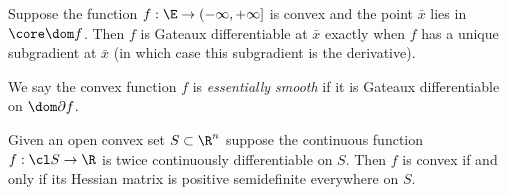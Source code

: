 \documentclass[../borwein-lewis_notes.tex]{subfiles}
\begin{document}
\begin{corollary}
\label{3.1.10} Suppose the function $f:\E\to(-\infty,+\infty]$ is convex 
and the point $\bar x$ lies in $\core\dom f$. Then $f$ is Gateaux 
differentiable at $\bar x$ exactly when $f$ has a unique subgradient 
at $\bar x$ (in which case this subgradient is the derivative).
\end{corollary}
We say the convex function $f$ is \textit{essentially smooth} if it 
is Gateaux differentiable on $\dom\partial f$.
\begin{theorem}
Given an open convex set $S\subset\R^n$ suppose the continuous function 
$f:\cl S\to\R$ is twice continuously differentiable on $S$. Then $f$ 
is convex if and only if its Hessian matrix is positive semidefinite 
everywhere on $S$.
\label{3.1.11}
\end{theorem}
\newpage
\end{document}
